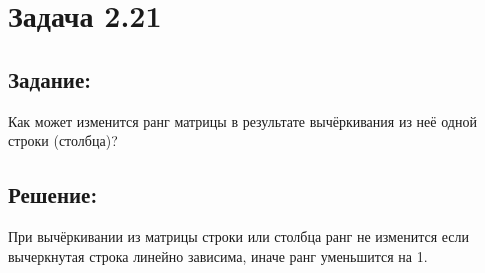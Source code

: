 \section{Задача 2.21}
\subsection{Задание:}
Как может изменится ранг матрицы в результате вычёркивания из неё одной строки (столбца)?
\subsection{Решение:}
При вычёркивании из матрицы строки или столбца ранг не изменится
если вычеркнутая строка линейно зависима, иначе ранг уменьшится на 1.
